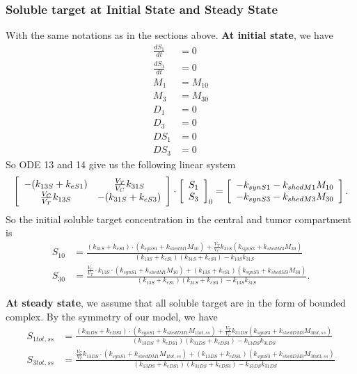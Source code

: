\subsubsection{Soluble target at Initial State and Steady State}
With the same notations as in the sections above.\newline 
\textbf{At initial state}, we have
\begin{align*}
    \frac{dS_1}{dt} & = 0 \\
    \frac{dS_3}{dt} & = 0 \\
                M_1 & = M_{10} \\
                M_3 & = M_{30} \\
                D_1 & = 0 \\
                D_3 & = 0 \\
               DS_1 & = 0 \\
               DS_3 & = 0 
\end{align*}
So ODE 13 and 14 give us the following linear system
\[
    \left[\begin{array}{cc} {-(k_{13S} + k_{eS1})} & {\frac{V_T}{V_C}k_{31S}} \\ {\frac{V_C}{V_T}k_{13S}} & {-(k_{31S} + k_{eS3})} \end{array}\right]
        \cdot \left[\begin{array}{c} {S_1} \\ {S_3} \end{array}\right]_0 = \left[\begin{array}{c} {-k_{synS1} - k_{shedM1}M_{10}} \\ {-k_{synS3} - k_{shedM3}M_{30}} \end{array}\right].
\]
So the initial soluble target concentration in the central and tumor compartment is
\begin{align}
    S_{10} & = \frac{(k_{31S} + k_{eS3})\cdot(k_{synS1} + k_{shedM1}M_{10})
                    + \frac{V_T}{V_C}k_{31S}(k_{synS3} + k_{shedM3}M_{30})}
                {(k_{13S} + k_{eS1})(k_{31S} + k_{eS3}) - k_{13S}k_{31S}} \\
    S_{30} & = \frac{\frac{V_C}{V_T}\cdot k_{13S}\cdot(k_{synS1} + k_{shedM1}M_{10})
                    + (k_{13S} + k_{eS1})(k_{synS3} + k_{shedM3}M_{30})}
            {(k_{13S} + k_{eS1})(k_{31S} + k_{eS3}) - k_{13S}k_{31S}}.
\end{align}

\textbf{At steady state}, we assume that all soluble target are in the form of bounded complex.
By the symmetry of our model, we have
\begin{align*}
    S_{1tot,ss} & = \frac{(k_{31DS} + k_{eDS3})\cdot(k_{synS1} + k_{shedDM1}M_{1tot,ss})
                    + \frac{V_T}{V_C}k_{31DS}(k_{synS3} + k_{shedDM3}M_{3tot,ss})}
                {(k_{13DS} + k_{eDS1})(k_{31DS} + k_{eDS3}) - k_{13DS}k_{31DS}} \\
    S_{3tot,ss} & = \frac{\frac{V_C}{V_T} k_{13DS}\cdot(k_{synS1} + k_{shedDM1}M_{1tot,ss})
                    + (k_{13DS} + k_{eDS1})(k_{synS3} + k_{shedDM3}M_{3tot3,ss})}
            {(k_{13DS} + k_{eDS1})(k_{31DS} + k_{eDS3}) - k_{13DS}k_{31DS}}
\end{align*}

